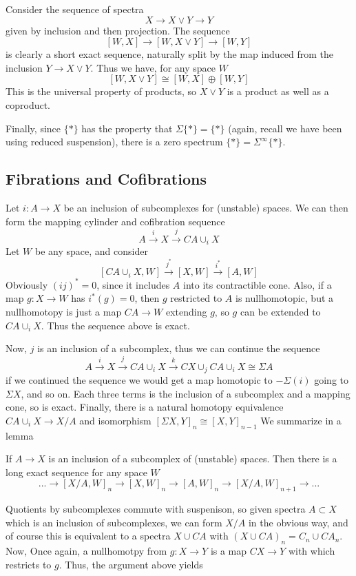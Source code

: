 Consider the sequence of spectra
\[X\to X\vee Y\to Y\]
given by inclusion and then projection.  The sequence
\[[W,X]\to [W, X\vee Y]\to [W,Y]\]
is clearly a short exact sequence, naturally split by the map induced from the inclusion $Y\to X\vee Y$.  
Thus we have, for any space $W$
\[[W,X\vee Y]\cong [W,X]\oplus [W,Y]\]
This is the universal property of products, so $X\vee Y$ is a product as well as a coproduct.  

Finally, since $\{*\}$ has the property that $\Sigma\{*\}=\{*\}$ (again, recall we have been using reduced suspension), there is a zero spectrum $\{*\}=\Sigma^\infty\{*\}$.  


\subsection{Fibrations and Cofibrations}

Let $i:A\to X$ be an inclusion of subcomplexes for (unstable) spaces.  
We can then form the mapping cylinder and cofibration sequence
\[A\xrightarrow{i} X\xrightarrow{j} CA\cup_i X\]
Let $W$ be any space, and consider
\[[CA\cup_i X,W]\xrightarrow{j^*} [X,W]\xrightarrow{i^*}[A,W]\]
Obviously $(ij)^*=0$, since it includes $A$ into its contractible cone.  
Also, if a map $g:X\to W$ has $i^*(g)=0$, then $g$ restricted to $A$ is nullhomotopic, but a nullhomotopy is just a map $CA\to W$ extending $g$, so $g$ can be extended to $CA\cup_i X$.  
Thus the sequence above is exact.  

Now, $j$ is an inclusion of a subcomplex, thus we can continue the sequence 
\[A\xrightarrow{i} X\xrightarrow{j} CA\cup_i X\xrightarrow{k} CX\cup_j CA\cup_i X\cong \Sigma A\]
if we continued the sequence we would get a map homotopic to $-\Sigma(i)$ going to $\Sigma X$, and so on.  
Each three terms is the inclusion of a subcomplex and a mapping cone, so is exact.  
Finally, there is a natural homotopy equivalence $CA\cup_i X\to X/A$ and isomorphism $[\Sigma X,Y]_n\cong [X,Y]_{n-1}$
We summarize in a lemma
\begin{Lemma}
  \label{sec:cofibspace}
  If $A\to X$ is an inclusion of a subcomplex of (unstable) spaces.  Then there is a long exact sequence for any space $W$
  \[...\to [X/A,W]_n\to [X,W]_n\to [A,W]_n\to [X/A,W]_{n+1}\to ...\]
\end{Lemma}

Quotients by subcomplexes commute with suspenison, so given spectra $A\subset X$ which is an inclusion of subcomplexes, we can form $X/A$ in the obvious way,
and of course this is equivalent to a spectra $X\cup CA$ with $(X\cup CA)_n=C_n\cup CA_n$.  
Now, Once again, a nullhomotpy from $g:X\to Y$ is a map $CX\to Y$ with which restricts to $g$.  
Thus, the argument above yields 

